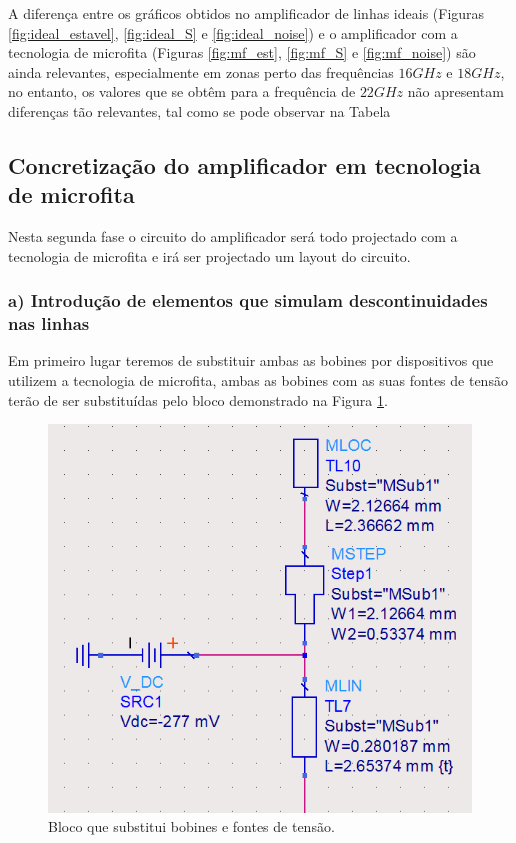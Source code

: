 \documentclass[11pt]{article}
\numberwithin{equation}{section}
\begin{document}


A diferença entre os gráficos obtidos no amplificador de linhas ideais (Figuras \ref{fig:ideal_estavel}, \ref{fig:ideal_S} e \ref{fig:ideal_noise}) e o amplificador com a tecnologia de microfita (Figuras \ref{fig:mf_est}, \ref{fig:mf_S} e \ref{fig:mf_noise}) são ainda relevantes, especialmente em zonas perto das frequências $ 16 GHz $ e $ 18 GHz $, no entanto, os valores que se obtêm para a frequência de $ 22 GHz $ não apresentam diferenças tão relevantes, tal como se pode observar na Tabela %


\subsection{Concretização do amplificador em tecnologia de microfita}

Nesta segunda fase o circuito do amplificador será todo projectado com a tecnologia de microfita e irá ser projectado um layout do circuito.

\subsubsection{a) Introdução de elementos que simulam descontinuidades nas linhas}

Em primeiro lugar teremos de substituir ambas as bobines por dispositivos que utilizem a tecnologia de microfita, ambas as bobines com as suas fontes de tensão terão de ser substituídas pelo bloco demonstrado na Figura \ref{fig:bobine}.

\begin{figure}[H]
	\centering
	\includegraphics[keepaspectratio=true, scale=0.45]{exps/bobine}
	\vspace{-0.5em}
	\caption{Bloco que substitui bobines e fontes de tensão.}
	\vspace{-0.8em}
	\label{fig:bobine}
\end{figure}
\end{document}
